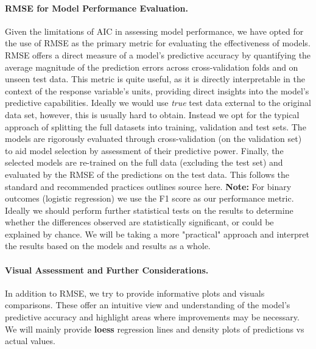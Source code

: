 \documentclass[12pt, twoside,hidelinks]{article}
\theoremstyle{definition}
\numberwithin{equation}{section}
\begin{document}
\paragraph{RMSE for Model Performance Evaluation.} Given the limitations of AIC in assessing model performance, we have opted for the use of RMSE as the primary metric for evaluating the effectiveness of models. RMSE offers a direct measure of a model's predictive accuracy by quantifying the average magnitude of the prediction errors across cross-validation folds and on unseen test data. This metric is quite useful, as it is directly interpretable in the context of the response variable's units, providing direct insights into the model's predictive capabilities. Ideally we would use \textit{true} test data external to the original data set, however, this is usually hard to obtain. Instead we opt for the typical approach of splitting the full datasets into training, validation and test sets. The models are rigorously evaluated through cross-validation (on the validation set) to aid model selection by assessment of their predictive power. Finally, the selected models are re-trained on the full data (excluding the test set) and evaluated by the RMSE of the predictions on the test data. This follows the standard and recommended practices outlines source here.
\textbf{Note:} For binary outcomes (logistic regression) we use the F1 score as our performance metric. Ideally we should perform further statistical tests on the results to determine whether the differences observed are statistically significant, or could be explained by chance. We will be taking a more "practical" approach and interpret the results based on the models and results as a whole.

\paragraph{Visual Assessment and Further Considerations.} In addition to RMSE, we try to provide informative plots and visuals comparisons. These offer an intuitive view and understanding of the model's predictive accuracy and highlight areas where improvements may be necessary. We will mainly provide \textbf{loess} regression lines and density plots of predictions vs actual values.
\end{document}
